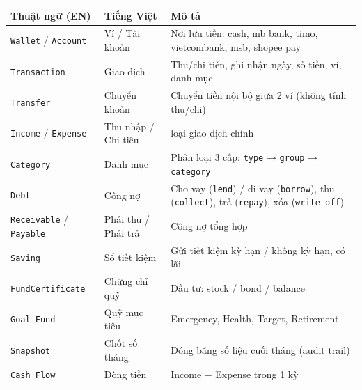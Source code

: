 \documentclass[11pt,a4paper]{article}
\newcounter{none}
\newcommand{\faintline}{%
  \noalign{\global\arrayrulecolor{faintgray}}%
  \hline
  \noalign{\global\arrayrulecolor{black}}%
} %
\begin{document}
{\def\LTcaptype{none}
\begin{longtable}[]{@{}
  >{\raggedright\arraybackslash}p{}
  >{\raggedright\arraybackslash}p{}
  >{\raggedright\arraybackslash}p{}@{}}
\toprule\noalign{}
\begin{minipage}[b]{\linewidth}\raggedright
Thuật ngữ (EN)
\end{minipage} & \begin{minipage}[b]{\linewidth}\raggedright
Tiếng Việt
\end{minipage} & \begin{minipage}[b]{\linewidth}\raggedright
Mô tả
\end{minipage} \\
\midrule\noalign{}
\endhead
\bottomrule\noalign{}
\endlastfoot
\texttt{Wallet} / \texttt{Account} & Ví / Tài khoản & Nơi lưu tiền: cash, mb bank, timo, vietcombank, msb, shopee pay \\ \faintline
\texttt{Transaction} & Giao dịch & Thu/chi tiền, ghi nhận ngày, số tiền, ví, danh mục \\ \faintline
\texttt{Transfer} & Chuyển khoản & Chuyển tiền nội bộ giữa 2 ví (không tính thu/chi) \\ \faintline
\texttt{Income} / \texttt{Expense} & Thu nhập / Chi tiêu & 2 loại giao dịch chính \\ \faintline
\texttt{Category} & Danh mục & Phân loại 3 cấp: \texttt{type} → \texttt{group} → \texttt{category} \\ \faintline
\texttt{Debt} & Công nợ & Cho vay (\texttt{lend}) / đi vay (\texttt{borrow}), thu (\texttt{collect}), trả (\texttt{repay}), xóa (\texttt{write-off}) \\ \faintline
\texttt{Receivable} / \texttt{Payable} & Phải thu / Phải trả & Công nợ tổng hợp \\ \faintline
\texttt{Saving} & Sổ tiết kiệm & Gửi tiết kiệm kỳ hạn / không kỳ hạn, có lãi \\ \faintline
\texttt{FundCertificate} & Chứng chỉ quỹ & Đầu tư: stock / bond / balance \\ \faintline
\texttt{Goal\ Fund} & Quỹ mục tiêu & Emergency, Health, Target, Retirement \\ \faintline
\texttt{Snapshot} & Chốt số tháng & Đóng băng số liệu cuối tháng (audit trail) \\ \faintline
\texttt{Cash\ Flow} & Dòng tiền & Income − Expense trong 1 kỳ \\
\end{longtable}
}
\end{document}
